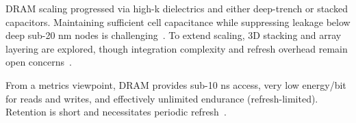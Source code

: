 
DRAM scaling progressed via high-k dielectrics and either deep-trench or stacked capacitors.
Maintaining sufficient cell capacitance while suppressing leakage below deep sub-20 nm nodes is
challenging~\cite{choi2022}. To extend scaling, 3D stacking and array layering are explored, though
integration complexity and refresh overhead remain open concerns~\cite{iedm2023_dram}.

From a metrics viewpoint, DRAM provides sub-10 ns access, very low energy/bit for reads and writes,
and effectively unlimited endurance (refresh-limited). Retention is short and necessitates periodic
refresh~\cite{kim2021_dram}.
